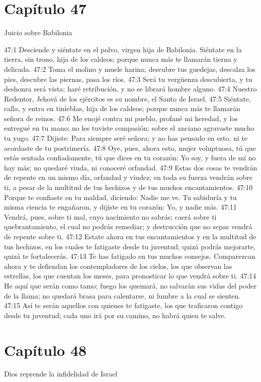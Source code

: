\section*{Capítulo 47 }
Juicio sobre Babilonia 
 
47:1 Desciende y siéntate en el polvo, virgen hija de Babilonia. Siéntate en la tierra, sin trono, hija de los caldeos; porque nunca más te llamarán tierna y delicada. 
47:2 Toma el molino y muele harina; descubre tus guedejas, descalza los pies, descubre las piernas, pasa los ríos. 
47:3 Será tu vergüenza descubierta, y tu deshonra será vista; haré retribución, y no se librará hombre alguno. 
47:4 Nuestro Redentor, Jehová de los ejércitos es su nombre, el Santo de Israel. 
47:5 Siéntate, calla, y entra en tinieblas, hija de los caldeos; porque nunca más te llamarán señora de reinos. 
47:6 Me enojé contra mi pueblo, profané mi heredad, y los entregué en tu mano; no les tuviste compasión; sobre el anciano agravaste mucho tu yugo. 
47:7 Dijiste: Para siempre seré señora; y no has pensado en esto, ni te acordaste de tu postrimería. 
47:8 Oye, pues, ahora esto, mujer voluptuosa, tú que estás sentada confiadamente, tú que dices en tu corazón: Yo soy, y fuera de mí no hay más; no quedaré viuda, ni conoceré orfandad. 
47:9 Estas dos cosas te vendrán de repente en un mismo día, orfandad y viudez; en toda su fuerza vendrán sobre ti, a pesar de la multitud de tus hechizos y de tus muchos encantamientos. 
47:10 Porque te confiaste en tu maldad, diciendo: Nadie me ve. Tu sabiduría y tu misma ciencia te engañaron, y dijiste en tu corazón: Yo, y nadie más. 
47:11 Vendrá, pues, sobre ti mal, cuyo nacimiento no sabrás; caerá sobre ti quebrantamiento, el cual no podrás remediar; y destrucción que no sepas vendrá de repente sobre ti. 
47:12 Estate ahora en tus encantamientos y en la multitud de tus hechizos, en los cuales te fatigaste desde tu juventud; quizá podrás mejorarte, quizá te fortalecerás. 
47:13 Te has fatigado en tus muchos consejos. Comparezcan ahora y te defiendan los contempladores de los cielos, los que observan las estrellas, los que cuentan los meses, para pronosticar lo que vendrá sobre ti. 
47:14 He aquí que serán como tamo; fuego los quemará, no salvarán sus vidas del poder de la llama; no quedará brasa para calentarse, ni lumbre a la cual se sienten. 
47:15 Así te serán aquellos con quienes te fatigaste, los que traficaron contigo desde tu juventud; cada uno irá por su camino, no habrá quien te salve. 
\section*{Capítulo 48 }
Dios reprende la infidelidad de Israel 
 
